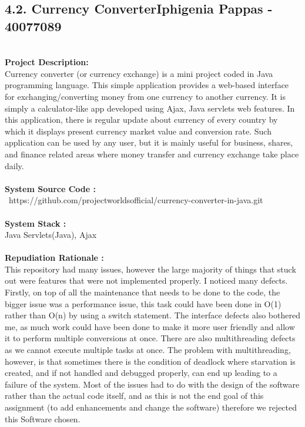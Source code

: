 \documentclass[letterpaper, 11pt]{report}
\begin{document}
\subsection*{4.2. Currency Converter\hfill {\normalsize{Iphigenia Pappas - 40077089}}} \\
\normalsize {\textbf{Project Description:}} \\
\normalsize {Currency converter (or currency exchange) is a mini project coded in Java programming language. This simple application provides a web-based interface for exchanging/converting money from one currency to another currency. It is simply a calculator-like app developed using Ajax, Java servlets web features. In this application, there is regular update about currency of every country by which it displays present currency market value and conversion rate. Such application can be used by any user, but it is mainly useful for business, shares, and finance related areas where money transfer and currency exchange take place daily.}\\
\\
\normalsize{\textbf{System Source Code :}} \\
\normalsize{\  https://github.com/projectworldsofficial/currency-converter-in-java.git }\\
\\
\normalsize{\textbf{System Stack :}}\\
\normalsize{Java Servlets(Java), Ajax}\\
\\
\normalsize{\textbf{Repudiation Rationale : }}\\
\normalsize{This repository had many issues, however the large majority of things that stuck out were features that were not implemented properly. I noticed many defects. Firstly, on top of all the maintenance that needs to be done to the code, the bigger issue was a performance issue, this task could have been done in O(1) rather than O(n) by using a switch statement. The interface defects also bothered me, as much work could have been done to make it more user friendly and allow it to perform multiple conversions at once. There are also multithreading defects as we cannot execute multiple tasks at once. The problem with multithreading, however, is that sometimes there is the condition of deadlock where starvation is created, and if not handled and debugged properly, can end up leading to a failure of the system. Most of the issues had to do with the design of the software rather than the actual code itself, and as this is not the end goal of this assignment (to add enhancements and change the software) therefore we rejected this Software chosen.}
\end{document}
